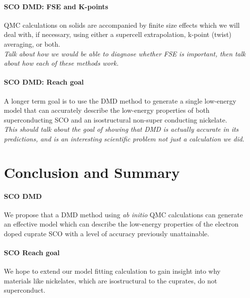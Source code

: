 \documentclass{article}
\begin{document}
\paragraph{SCO DMD:  FSE and K-points} QMC calculations on solids are accompanied by finite size effects which we will deal with, if necessary, using either a supercell extrapolation, k-point (twist) averaging, or both.
\\
\textit{Talk about how we would be able to diagnose whether FSE is important, then talk about how each of these methods work.}
 
 \paragraph{SCO DMD: Reach goal} A longer term goal is to use the DMD method to generate a single low-energy model that can accurately describe the low-energy properties of both superconducting SCO and an isostructural non-super conducting nickelate.
 \\
 \textit{This should talk about the goal of showing that DMD is actually accurate in its predictions, and is an interesting scientific problem not just a calculation we did.}

\section{Conclusion and Summary}
\paragraph{SCO DMD} We propose that a DMD method using \textit{ab initio} QMC calculations can generate an effective model which can describe the low-energy properties of the electron doped cuprate SCO with a level of accuracy previously unattainable.

\paragraph{SCO Reach goal} We hope to extend our model fitting calculation to gain insight into why materials like nickelates, which are isostructural to the cuprates, do not superconduct. 
\end{document}
